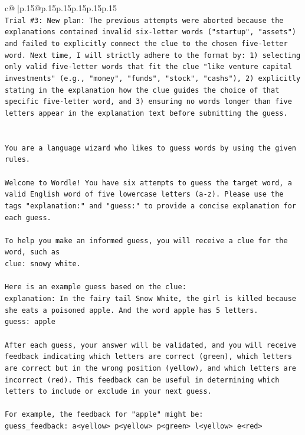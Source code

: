 \documentclass{article}
\begin{document}
{\begin{supertabular}{c@{$\;$}|p{.15\linewidth}@{}p{.15\linewidth}p{.15\linewidth}p{.15\linewidth}p{.15\linewidth}p{.15\linewidth}}
{{{\\ 
\texttt{Trial \#3: New plan: The previous attempts were aborted because the explanations contained invalid six{-}letter words ("startup", "assets") and failed to explicitly connect the clue to the chosen five{-}letter word. Next time, I will strictly adhere to the format by: 1) selecting only valid five{-}letter words that fit the clue "like venture capital investments" (e.g., "money", "funds", "stock", "cashs"), 2) explicitly stating in the explanation how the clue guides the choice of that specific five{-}letter word, and 3) ensuring no words longer than five letters appear in the explanation text before submitting the guess.} \\
\\ 
\\ 
\texttt{You are a language wizard who likes to guess words by using the given rules.} \\
\\ 
\texttt{Welcome to Wordle! You have six attempts to guess the target word, a valid English word of five lowercase letters (a{-}z). Please use the tags "explanation:" and "guess:" to provide a concise explanation for each guess.} \\
\\ 
\texttt{To help you make an informed guess, you will receive a clue for the word, such as} \\
\texttt{clue: snowy white.} \\
\\ 
\texttt{Here is an example guess based on the clue:} \\
\texttt{explanation: In the fairy tail Snow White, the girl is killed because she eats a poisoned apple. And the word apple has 5 letters.} \\
\texttt{guess: apple} \\
\\ 
\texttt{After each guess, your answer will be validated, and you will receive feedback indicating which letters are correct (green), which letters are correct but in the wrong position (yellow), and which letters are incorrect (red). This feedback can be useful in determining which letters to include or exclude in your next guess.} \\
\\ 
\texttt{For example, the feedback for "apple" might be:} \\
\texttt{guess\_feedback: a<yellow> p<yellow> p<green> l<yellow> e<red>} \\
\\ 
}}}
\end{supertabular}}
\end{document}
